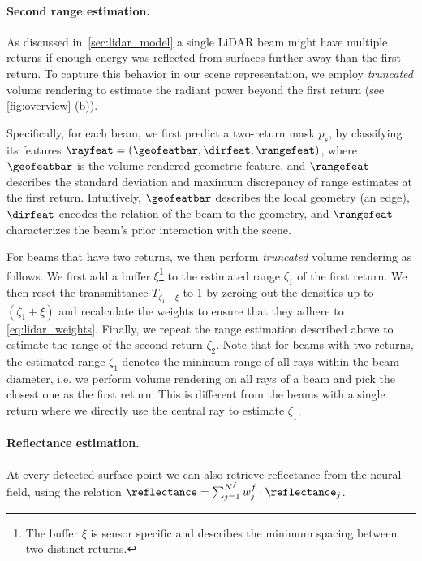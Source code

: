 \paragraph{Second range estimation.}
As discussed in~\cref{sec:lidar_model} a single LiDAR beam might have multiple returns if enough energy was reflected from surfaces further away than the first return. To capture this behavior in our scene representation, we employ \textit{truncated} volume rendering to estimate the radiant power beyond the first return (see \cref{fig:overview} (b)).

Specifically, for each beam, we first predict a two-return mask $p_s$, by classifying its features $\rayfeat = (\geofeatbar,\dirfeat,\rangefeat)$, where $\geofeatbar$ is the volume-rendered geometric feature, and $\rangefeat$ describes the standard deviation and maximum discrepancy of range estimates at the first return. Intuitively, $\geofeatbar$ describes the local geometry (\eg an edge), $\dirfeat$ encodes the relation of the beam to the geometry, and $\rangefeat$ characterizes the beam's prior interaction with the scene.

For beams that have two returns, we then perform \textit{truncated} volume rendering as follows. We first add a buffer $\xi$\footnote{The buffer $\xi$ is sensor specific and describes the minimum spacing between two distinct returns.} to the estimated range $\zeta_1$ of the first return. We then reset the transmittance $T_{\zeta_1 + \xi}$ to 1 by zeroing out the densities up to $(\zeta_1 + \xi)$ and recalculate the weights to ensure that they adhere to \cref{eq:lidar_weights}. Finally, we repeat the range estimation described above to estimate the range of the second return $\zeta_2$. Note that for beams with two returns, the estimated range $\zeta_1$ denotes the minimum range of all rays within the beam diameter, i.e. we perform volume rendering on all rays of a beam and pick the closest one as the first return. This is different from the beams with a single return where we directly use the central ray to estimate $\zeta_1$. 






\paragraph{Reflectance estimation.}
At every detected surface point we can also retrieve reflectance from the neural field, using the relation $\reflectance = \sum_{j=1}^{N^f} w_j^f \cdot \reflectance_j$.


